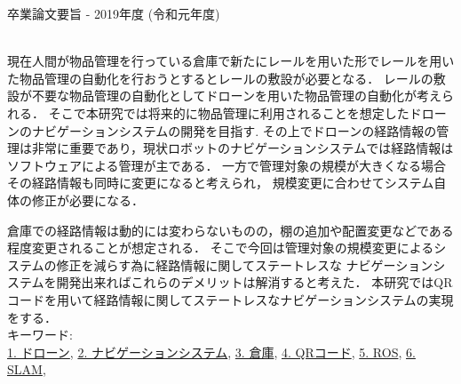 卒業論文要旨 - 2019年度 (令和元年度)
\begin{center}
\begin{large}
\end{large}
\end{center}
~ \\
現在人間が物品管理を行っている倉庫で新たにレールを用いた形でレールを用いた物品管理の自動化を行おうとするとレールの敷設が必要となる．
レールの敷設が不要な物品管理の自動化としてドローンを用いた物品管理の自動化が考えられる．
そこで本研究では将来的に物品管理に利用されることを想定したドローンのナビゲーションシステムの開発を目指す.
その上でドローンの経路情報の管理は非常に重要であり，現状ロボットのナビゲーションシステムでは経路情報はソフトウェアによる管理が主である．
一方で管理対象の規模が大きくなる場合その経路情報も同時に変更になると考えられ，
規模変更に合わせてシステム自体の修正が必要になる．

倉庫での経路情報は動的には変わらないものの，棚の追加や配置変更などである程度変更されることが想定される．
そこで今回は管理対象の規模変更によるシステムの修正を減らす為に経路情報に関してステートレスな
ナビゲーションシステムを開発出来ればこれらのデメリットは解消すると考えた．
本研究ではQRコードを用いて経路情報に関してステートレスなナビゲーションシステムの実現をする．
~ \\
キーワード:\\
\underline{1. ドローン},
\underline{2. ナビゲーションシステム},
\underline{3. 倉庫},
\underline{4. QRコード},
\underline{5. ROS},
\underline{6. SLAM},
\begin{flushright}
\dept \\
\author
\end{flushright}
